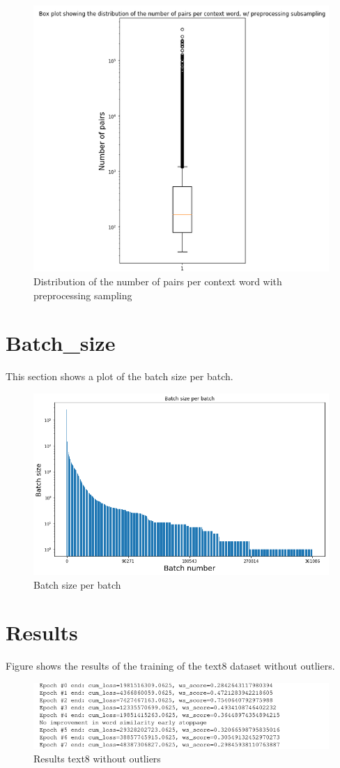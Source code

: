 \documentclass{scrartcl}
\begin{document}
\begin{figure}[h!]
\caption{Distribution of the number of pairs per context word with preprocessing sampling}
\includegraphics[scale=0.45]{preprocessing_sampling_boxplot}
\centering
\end{figure}

\newpage
\section{Batch\_size}
This section shows a plot of the batch size per batch.
\begin{figure}[h!]
\caption{Batch size per batch}
\includegraphics[scale=0.65]{batch_sizes}
\centering
\end{figure}
\section{Results}
Figure shows the results of the training of the text8 dataset without outliers. 
\begin{figure}[h!]
\caption{Results text8 without outliers}
\includegraphics[scale=0.65]{text8_without_outliers}
\centering
\end{figure}
\end{document}
